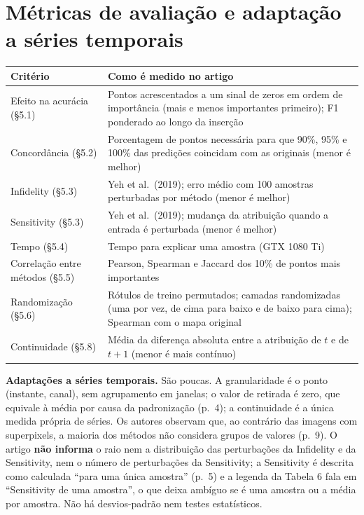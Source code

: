\documentclass[11pt,a4paper]{article}
\begin{document}
\section{Métricas de avaliação e adaptação a séries temporais}
\begin{center}\small
\begin{tabularx}{\linewidth}{lX}
\toprule
\textbf{Critério} & \textbf{Como é medido no artigo} \\
\midrule
Efeito na acurácia (§5.1) & Pontos acrescentados a um sinal de zeros em ordem de importância (mais e menos importantes primeiro); F1 ponderado ao longo da inserção \\
Concordância (§5.2) & Porcentagem de pontos necessária para que 90\%, 95\% e 100\% das predições coincidam com as originais (menor é melhor) \\
Infidelity (§5.3) & Yeh et al.\ (2019); erro médio com 100 amostras perturbadas por método (menor é melhor) \\
Sensitivity (§5.3) & Yeh et al.\ (2019); mudança da atribuição quando a entrada é perturbada (menor é melhor) \\
Tempo (§5.4) & Tempo para explicar uma amostra (GTX 1080 Ti) \\
Correlação entre métodos (§5.5) & Pearson, Spearman e Jaccard dos 10\% de pontos mais importantes \\
Randomização (§5.6) & Rótulos de treino permutados; camadas randomizadas (uma por vez, de cima para baixo e de baixo para cima); Spearman com o mapa original \\
Continuidade (§5.8) & Média da diferença absoluta entre a atribuição de $t$ e de $t+1$ (menor é mais contínuo) \\
\bottomrule
\end{tabularx}
\end{center}
\textbf{Adaptações a séries temporais.} São poucas. A granularidade é o ponto (instante, canal), sem agrupamento em janelas; o valor de retirada é zero, que equivale à média por causa da padronização (p.~4); a continuidade é a única medida própria de séries. Os autores observam que, ao contrário das imagens com superpixels, a maioria dos métodos não considera grupos de valores (p.~9). O artigo \textbf{não informa} o raio nem a distribuição das perturbações da Infidelity e da Sensitivity, nem o número de perturbações da Sensitivity; a Sensitivity é descrita como calculada ``para uma única amostra'' (p.~5) e a legenda da Tabela 6 fala em ``Sensitivity de uma amostra'', o que deixa ambíguo se é uma amostra ou a média por amostra. Não há desvios-padrão nem testes estatísticos.
\end{document}
